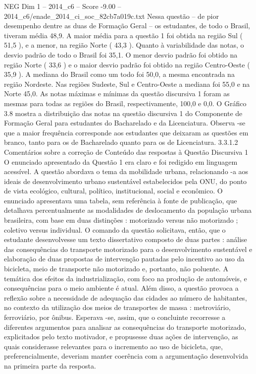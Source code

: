 \begin{textsample}{NEG Dim 1 – 2014\_c6 – Score -9.00 – 2014\_c6/enade\_2014\_ci\_soc\_82cb7a019c.txt}
Nessa questão – de pior desempenho dentre as duas de Formação Geral – os estudantes, de todo o Brasil, tiveram média 48,9.
A maior média para a questão 1 foi obtida na região Sul ( 51,5 ), e a menor, na região Norte ( 43,3 ).
Quanto à variabilidade das notas, o desvio padrão de todo o Brasil foi 35,1.
O menor desvio padrão foi obtido na região Norte ( 33,6 ) e o maior desvio padrão foi obtido na região Centro-Oeste ( 35,9 ).
A mediana do Brasil como um todo foi 50,0, a mesma encontrada na região Nordeste.
Nas regiões Sudeste, Sul e Centro-Oeste a mediana foi 55,0 e na Norte 45,0.
As notas máximas e mínimas da questão discursiva 1 foram as mesmas para todas as regiões do Brasil, respectivamente, 100,0 e 0,0.
O Gráfico 3.8 mostra a distribuição das notas na questão discursiva 1 do Componente de Formação Geral para estudantes do Bacharelado e da Licenciatura.
Observa -se que a maior frequência corresponde aos estudantes que deixaram as questões em branco, tanto para os de Bacharelado quanto para os de Licenciatura. 3.3.1.2 Comentários sobre a correção de Conteúdo das respostas à Questão Discursiva 1 O enunciado apresentado da Questão 1 era claro e foi redigido em linguagem acessível.
A questão abordava o tema da mobilidade urbana, relacionando -a aos ideais de desenvolvimento urbano sustentável estabelecidos pela ONU, do ponto de vista ecológico, cultural, político, institucional, social e econômico.
O enunciado apresentava uma tabela, sem referência à fonte de publicação, que detalhava percentualmente as modalidades de deslocamento da população urbana brasileira, com base em duas distinções : motorizado versus não motorizado ; coletivo versus individual.
O comando da questão solicitava, então, que o estudante desenvolvesse um texto dissertativo composto de duas partes : análise das consequências do transporte motorizado para o desenvolvimento sustentável e elaboração de duas propostas de intervenção pautadas pelo incentivo ao uso da bicicleta, meio de transporte não motorizado e, portanto, não poluente.
A temática dos efeitos da industrialização, com foco na produção de automóveis, e consequências para o meio ambiente é atual.
Além disso, a questão provoca a reflexão sobre a necessidade de adequação das cidades ao número de habitantes, no contexto da utilização dos meios de transportes de massa : metroviário, ferroviário, por ônibus.
Esperava -se, assim, que o concluinte recorresse a diferentes argumentos para analisar as consequências do transporte motorizado, explicitados pelo texto motivador, e propusesse duas ações de intervenção, as quais considerasse relevantes para o incremento ao uso de bicicleta, que, preferencialmente, deveriam manter coerência com a argumentação desenvolvida na primeira parte da resposta.

\end{textsample}
